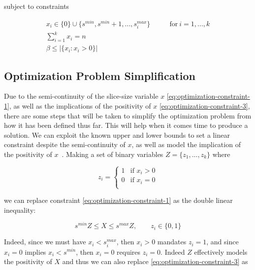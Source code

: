 \documentclass[../mthe-493-final-project.tex]{subfiles}
\begin{document}
    subject to constraints

    \begin{align}
        x_i \in \{0\} \cup \{s^{min}, s^{min} + 1,...,s^{max}_i\} &\qquad \text{for} \ i=1,...,k \label{eq:optimization-constraint-1} \\
        \sum_{i = 1}^k x_i = n \label{eq:optimization-constraint-2} \\
        \beta \leq \vert \{x_i : x_i > 0\} \vert \label{eq:optimization-constraint-3}
    \end{align}
    
    \subsection{Optimization Problem Simplification}
    \label{ssec:optimization-problem-simplification}
    
     Due to the semi-continuity of the slice-size variable $x$ \eqref{eq:optimization-constraint-1}, as well as the implications of the positivity of $x$ \eqref{eq:optimization-constraint-3}, there are some steps that will be taken to simplify the optimization problem from how it has been defined thus far. This will help when it comes time to produce a solution. We can exploit the known upper and lower bounds to set a linear constraint despite the semi-continuity of $x$, as well as model the implication of the positivity of $x$~\cite{9_mixed_integer_optimization_mosek_modeling_cookbook_3.2.3_2021}. Making a set of binary variables $Z = \{z_1,...,z_k\}$ where
     
    \[z_i =
        \begin{cases}
            1 & \text{if $x_i > 0$}\\
            0 & \text{if $x_i = 0$}\\
        \end{cases}
    \]
     
     we can replace constraint \eqref{eq:optimization-constraint-1} as the double linear inequality:
     
     \begin{equation}
        \label{eq:simplified-optimization-constraint-1}
         s^{min}Z \leq X \leq s^{max}Z, \qquad z_i \in \{0,1\}
     \end{equation}
     
     Indeed, since we must have $x_i < s_i^{max}$, then $x_i > 0$ mandates $z_i = 1$, and since $x_i = 0$ implies $x_i < s^{min}$, then $x_i = 0$ requires $z_i = 0$. Indeed $Z$ effectively models the positivity of $X$ and thus we can also replace \eqref{eq:optimization-constraint-3} as
     
\end{document}
